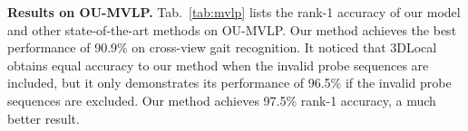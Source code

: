 \documentclass[runningheads]{llncs}
\begin{document}
\textbf{Results on OU-MVLP.} Tab.~\ref{tab:mvlp} lists the rank-1 accuracy of our model and other state-of-the-art methods on OU-MVLP. Our method achieves the best performance of 90.9\% on cross-view gait recognition. It noticed that 3DLocal obtains equal accuracy to our method when the invalid probe sequences are included, but it only demonstrates its performance of 96.5\% if the invalid probe sequences are excluded. Our method achieves 97.5\% rank-1 accuracy, a much better result.



\begin{table*}[htbp]
    \caption{Rank-1 accuracy (\%) on OUMVLP dataset under different view angles, excluding identical-view cases. The top eight rows and bottom six rows show the results with and without invalid probe sequences, respectively.}
  \centering
  \label{tab:mvlp}
  \vspace*{-1em}
\end{table*}
\end{document}
